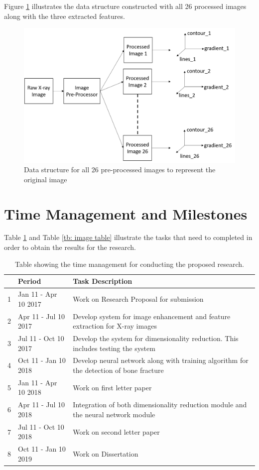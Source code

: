 \documentclass[11pt]{article}
\begin{document}
	Figure \ref{fig: data_structure} illustrates the data structure constructed with all 26 processed images along with the three extracted features.
	\begin{figure}[!h]
		\centering
		\includegraphics[scale=0.3]{image_processing.png}
		\caption{Data structure for all 26 pre-processed images to represent the original image}
		\label{fig: data_structure}
	\end{figure}

	\section{Time Management and Milestones}
	\label{sc: Time Management and Milestones}
	Table \ref{time_management} and Table \ref{tb: image table} illustrate the tasks that need to completed in order to obtain the results for the research.
	\begin{table}[!h]
		\centering
		\caption{Table showing the time management for conducting the proposed research.}
		\label{time_management}
		\begin{tabular}{| c | l | p{9.5cm} |}
			\hline
			& Period & Task Description \\
			\hline \hline
			1 & Jan 11 - Apr 10 2017 & Work on Research Proposal for submission\\
			\hline
			2 & Apr 11 - Jul 10 2017 & Develop system for image enhancement and feature extraction for X-ray images \\
			\hline
			3 & Jul 11 - Oct 10 2017 &  Develop the system for dimensionality reduction. This includes testing the system\\
			\hline
			4 & Oct 11 - Jan 10 2018 & Develop neural network along with training algorithm for the detection of bone fracture \\
			\hline
			5 & Jan 11 - Apr 10 2018 & Work on first letter paper \\
			\hline
			6 & Apr 11 - Jul 10 2018 & Integration of both dimensionality reduction module and the neural network module \\
			\hline
			7 & Jul 11 - Oct 10 2018 & Work on second letter paper\\
			\hline
			8 & Oct 11 - Jan 10 2019 & Work on Dissertation \\
			\hline
		\end{tabular}
	\end{table}
	
\end{document}
